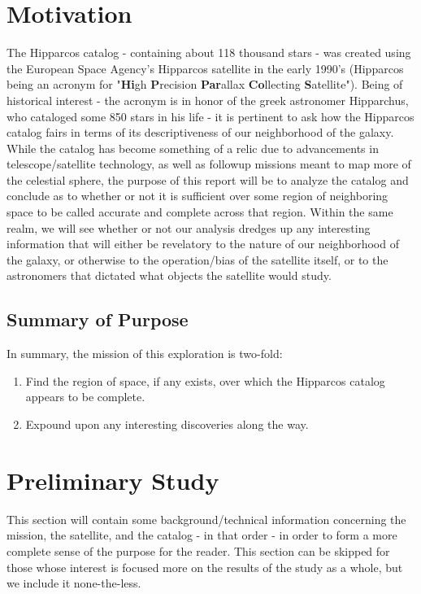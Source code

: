 \documentclass{business-covered} %
\subtitle{An Analysis of the completeness of the Hipparchus Catalog}
\begin{document}
	
	\section{Motivation}
		The Hipparcos catalog - containing about 118 thousand stars - was created using the European Space Agency's Hipparcos satellite in the early 1990's (Hipparcos being an acronym for "\textbf{Hi}gh \textbf{P}recision \textbf{Par}allax \textbf{Co}llecting \textbf{S}atellite"). Being of historical interest - the acronym is in honor of the greek astronomer Hipparchus, who cataloged some 850 stars in his life - it is pertinent to ask how the Hipparcos catalog fairs in terms of its descriptiveness of our neighborhood of the galaxy. While the catalog has become something of a relic due to advancements in telescope/satellite technology, as well as followup missions meant to map more of the celestial sphere, the purpose of this report will be to analyze the catalog and conclude as to whether or not it is sufficient over some region of neighboring space to be called  accurate and complete across that region. Within the same realm, we will see whether or not our analysis dredges up any interesting information that will either be revelatory to the nature of our neighborhood of the galaxy, or otherwise to the operation/bias of the satellite itself, or to the astronomers that dictated what objects the satellite would study.
		\subsection{Summary of Purpose}
		In summary, the mission of this exploration is two-fold:
		
		\begin{enumerate}
			\item Find the region of space, if any exists, over which the Hipparcos catalog appears to be complete.
			\item Expound upon any interesting discoveries along the way.
		\end{enumerate}

\pagebreak
	\section{Preliminary Study}
		This section will contain some background/technical information concerning the mission, the satellite, and the catalog - in that order - in order to form a more complete sense of the purpose for the reader. This section can be skipped for those whose interest is focused more on the results of the study as a whole, but we include it none-the-less.
\end{document}
